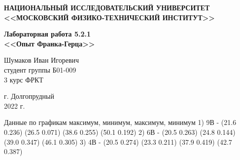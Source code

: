 \documentclass[a4paper,12pt]{article} %
\begin{document}
	
	
	\begin{center}
		
		\textbf{НАЦИОНАЛЬНЫЙ ИССЛЕДОВАТЕЛЬСКИЙ УНИВЕРСИТЕТ \\ <<МОСКОВСКИЙ ФИЗИКО-ТЕХНИЧЕСКИЙ ИНСТИТУТ>>}
		\vspace{13ex}
		
		\textbf{Лабораторная работа 5.2.1\\ <<Опыт Франка-Герца>>}
		\vspace{40ex}
		
		\normalsize{Шумаков Иван Игоревич \\ студент группы Б01-009\\ 3 курс ФРКТ\\}
	\end{center}
	
	\vfill 
	
	\begin{center}
		г. Долгопрудный\\ 
		2022 г.
	\end{center}
	
	
	\thispagestyle{empty} %
	\newpage


    Данные по графикам
    максимум, минимум, максимум, минимум
    1) 9В - (21.6	0.236) (26.5	0.071) (38.6	0.255) (50.1	0.192)
    2) 6В - (20.5   0.263) (24.8	0.144) (39.0	0.347) (46.1	0.305)
    3) 4В - (20.5   0.274) (23.3	0.211) (37.9    0.419) (42.7	0.387)
\end{document}
